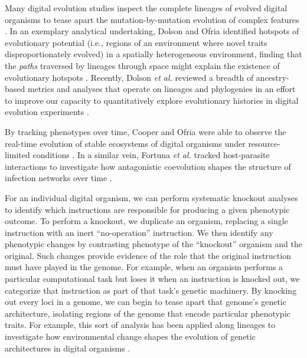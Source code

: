 Many digital evolution studies inspect the complete lineages of evolved digital organisms to tease apart the mutation-by-mutation evolution of complex features \citep{lenski_evolutionary_2003,dolson_spatial_2017,grabowski_case_2013,goldsby_evolutionary_2014,pontes_evolutionary_2019}.
In an exemplary analytical undertaking, Dolson and Ofria identified hotspots of evolutionary potential (i.e., regions of an environment where novel traits disproportionately evolved) in a spatially heterogeneous environment, finding that the \textit{paths} traversed by lineages through space might explain the existence of evolutionary hotspots \citep{dolson_hotspots_2017}. 
Recently, Dolson \textit{et al.} reviewed a breadth of ancestry-based metrics and analyses that operate on lineages and phylogenies in an effort to improve our capacity to quantitatively explore evolutionary histories in digital evolution experiments \citep{dolson_interpreting_2020}.

By tracking phenotypes over time, Cooper and Ofria were able to observe the real-time evolution of stable ecosystems of digital organisms under resource-limited conditions \citep{cooper_evolution_2002}.
In a similar vein, Fortuna \textit{et al.} tracked host-parasite interactions to investigate how antagonistic coevolution shapes the structure of infection networks over time \citep{fortuna_coevolutionary_2019}.

For an individual digital organism, we can perform systematic knockout analyses to identify which instructions are responsible for producing a given phenotypic outcome.
To perform a knockout, we duplicate an organism, replacing a single instruction with an inert ``no-operation'' instruction.
We then identify any phenotypic changes by contrasting phenotype of the ``knockout'' organism and the original.
Such changes provide evidence of the role that the original instruction must have played in the genome.
For example, when an organism performs a particular computational task but loses it when an instruction is knocked out, we categorize that instruction as part of that task's genetic machinery.
By knocking out every loci in a genome, we can begin to tease apart that genome's genetic architecture, isolating regions of the genome that encode particular phenotypic traits.
For example, this sort of analysis has been applied along lineages to investigate how environmental change shapes the evolution of genetic architectures in digital organisms \citep{canino-koning_evolution_2016}.

